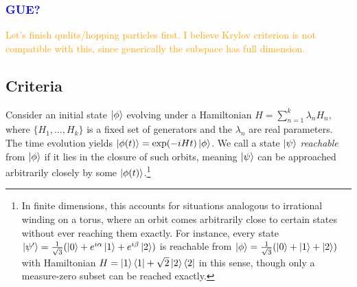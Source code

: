 \documentclass[aps,prx,reprint,superscriptaddress,footnote, twocolumn,notitlepage]{revtex4-2}
\newcommand{\yu}[1]{\textcolor{blue}{#1}}
\newcommand{\ko}[1]{\textcolor{orange}{#1}}
\begin{document}
\subsubsection{\yu{GUE?}}
\ko{Let's finish qudits/hopping particles first. I believe Krylov criterion is not compatible with this, since generically the subspace has full dimension.}
\subsection{Criteria}




Consider an initial state $\ket{\phi}$ evolving under a Hamiltonian $H = \sum_{n=1}^{k} \lambda_n H_n$, where $\{H_1, \ldots, H_k\}$ is a fixed set of generators and the $\lambda_n$ are real parameters. The time evolution yields $\ket{\phi(t)} = \exp(-iHt)\ket{\phi}$. We call a state $\ket{\psi}$ \emph{reachable} from $\ket{\phi}$ if it lies in the closure of such orbits, meaning $\ket{\psi}$ can be approached arbitrarily closely by some $\ket{\phi(t)}$.\footnote{In finite dimensions, this accounts for situations analogous to irrational winding on a torus, where an orbit comes arbitrarily close to certain states without ever reaching them exactly. For instance, every state $\ket{\psi'} = \frac{1}{\sqrt{3}}(\ket{0} + e^{i\alpha}\ket{1} + e^{i\beta}\ket{2})$ is reachable from $\ket{\phi} = \frac{1}{\sqrt{3}}(\ket{0} + \ket{1} + \ket{2})$ with Hamiltonian $H = \ket{1}\bra{1} + \sqrt{2}\ket{2}\bra{2}$ in this sense, though only a measure-zero subset can be reached exactly.}
\end{document}
